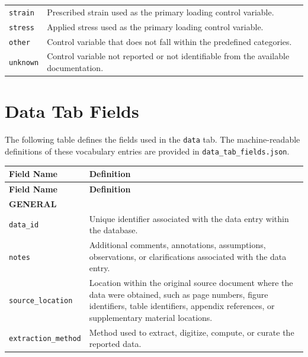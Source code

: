 \documentclass[11pt]{book}
\begin{document}
{\begin{longtable}{p{}p{}}
\texttt{strain} &
Prescribed strain used as the primary loading control variable. \\

\texttt{stress} &
Applied stress used as the primary loading control variable. \\

\texttt{other} &
Control variable that does not fall within the predefined categories. \\

\texttt{unknown} &
Control variable not reported or not identifiable from the available documentation. \\

\hline
\end{longtable}



\section{Data Tab Fields}
\label{vocab:data_fields_tab}

The following table defines the fields used in the \texttt{data} tab. The machine-readable definitions of these vocabulary entries are provided in \texttt{data\_tab\_fields.json}.

\begin{longtable}{p{}p{}}
\hline
\textbf{Field Name} & \textbf{Definition} \\
\hline
\endfirsthead

\hline
\textbf{Field Name} & \textbf{Definition} \\
\hline
\endhead

\multicolumn{2}{l}{\textbf{GENERAL}}\\
\hline

\texttt{data\_id} &
Unique identifier associated with the data entry within the database. \\

\texttt{notes} &
Additional comments, annotations, assumptions, observations, or clarifications associated with the data entry. \\

\texttt{source\_location} &
Location within the original source document where the data were obtained, such as page numbers, figure identifiers, table identifiers, appendix references, or supplementary material locations. \\

\texttt{extraction\_method} &
Method used to extract, digitize, compute, or curate the reported data. \\


\end{longtable}}
\end{document}
